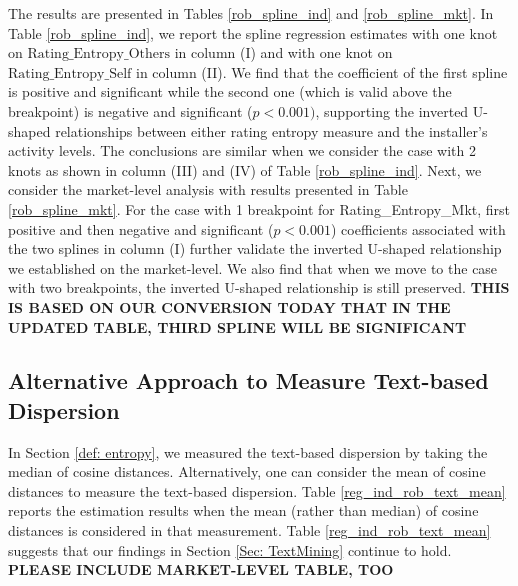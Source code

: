 \documentclass[msom,blindrev]{informs3}
\begin{document}
	
	The results are presented in Tables \ref{rob_spline_ind} and \ref{rob_spline_mkt}. In Table \ref{rob_spline_ind}, we report the spline regression estimates with one knot on $\text{Rating\_Entropy\_Others}$ in column (I) and with one knot on $\text{Rating\_Entropy\_Self}$ in column (II). We find that the coefficient of the first spline is positive and significant while the second one (which is valid above the breakpoint) is negative and significant ($p<0.001)$, supporting the inverted U-shaped relationships between either rating entropy measure and the installer's activity levels. The conclusions are similar when we consider the case with 2 knots as shown in column (III) and (IV) of Table \ref{rob_spline_ind}.  Next, we consider the market-level analysis with results presented in Table \ref{rob_spline_mkt}. For the case with 1 breakpoint for Rating\_Entropy\_Mkt, first positive and then negative and significant ($p<0.001$) coefficients associated with the two splines in column (I) further validate the inverted U-shaped relationship we established on the market-level. We also find that when we move to the case with two breakpoints, the inverted U-shaped relationship is still preserved. \textbf{THIS IS BASED ON OUR CONVERSION TODAY THAT IN THE UPDATED TABLE, THIRD SPLINE WILL BE SIGNIFICANT}
	
	
	
	\subsection{Alternative Approach to Measure Text-based Dispersion}
	
	In Section \ref{def: entropy}, we measured the text-based dispersion by taking the median of cosine distances. Alternatively, one can consider the mean of cosine distances to measure the text-based dispersion. Table \ref{reg_ind_rob_text_mean} reports the estimation results when the mean (rather than median) of cosine distances is considered in that measurement. Table \ref{reg_ind_rob_text_mean} suggests that our findings in Section \ref{Sec: TextMining} continue to hold. \textbf{PLEASE INCLUDE MARKET-LEVEL TABLE, TOO}
	
\end{document}
